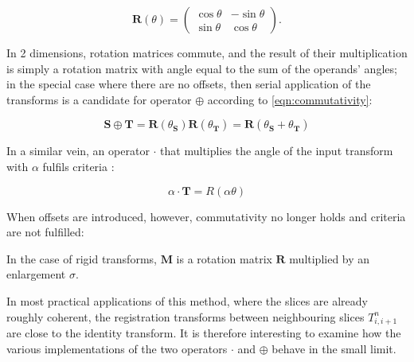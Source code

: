		\begin{equation}
			\mathbf{R}(\theta) = \left( \begin{matrix}
			  										 \cos \theta & -\sin\theta \\
														 \sin\theta & \cos\theta
					                 \end{matrix} \right) .
		\end{equation}
		
		In 2 dimensions, rotation matrices commute, and the result of their multiplication is simply a rotation matrix with angle equal to the sum of the operands' angles; in the special case where there are no offsets, then serial application of the transforms is a candidate for operator $\oplus$ according to \ref{eqn:commutativity}:
		
		\begin{equation}
			\mathbf{S} \oplus \mathbf{T} = \mathbf{R}(\theta_\mathbf{S})\mathbf{R}(\theta_\mathbf{T}) = \mathbf{R}(\theta_\mathbf{S} + \theta_\mathbf{T})
		\end{equation}
		
		
		In a similar vein, an operator $\cdot$ that multiplies the angle of the input transform with $\alpha$ fulfils criteria :
    
    \begin{equation}
      \alpha \cdot \mathbf{T} = R(\alpha\theta)
    \end{equation}
		
		When offsets are introduced, however, commutativity no longer holds and criteria  are not fulfilled:
		
		
		In the case of rigid transforms, $\mathbf{M}$ is a rotation matrix $\mathbf{R}$ multiplied by an enlargement $\sigma$. 
		
		In most practical applications of this method, where the slices are already roughly coherent, the registration transforms between neighbouring slices $T_{i,i+1}^n$ are close to the identity transform. It is therefore interesting to examine how the various implementations of the two operators $\cdot$ and $\oplus$ behave in the small limit.
	
	
